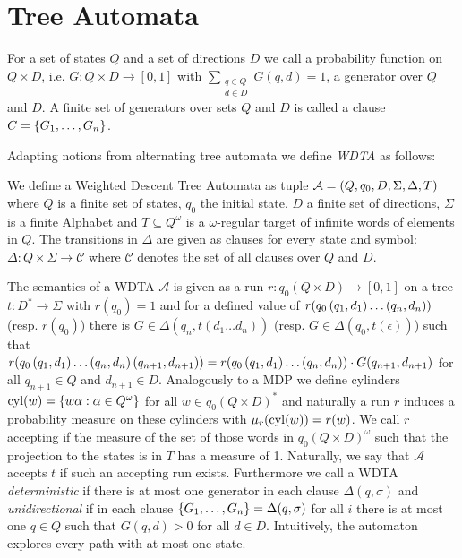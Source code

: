 \chapter{Tree Automata}
\begin{definition}[Generator]
  For a set of states $Q$ and a set of directions $D$ we call a probability
  function on $Q\times D$, i.e. $G: Q\times D\rightarrow [0,1]$ with
  $\sum\limits_{\substack{q\in Q\\ d\in D}}G(q,d) = 1$, a generator over $Q$
  and $D$. A finite set of generators over sets $Q$ and $D$ is called a clause
  $C = \left\{G_{1},\dots,G_{n}\right\}$.
\end{definition}
Adapting notions from alternating tree automata we define \emph{\ac{WDTA}} as
follows:
\begin{definition}
  We define a Weighted Descent Tree Automata as tuple
  $\mathcal{A} = \left(Q, q_{0}, D, \Sigma, \Delta, T\right)$ where $Q$ is a finite
  set of states, $q_{0}$ the initial state, $D$ a finite set of directions,
  $\Sigma$ is a finite Alphabet and $T\subseteq Q^{\omega}$ is a
  $\omega$-regular target of infinite words of elements in $Q$. The transitions
  in $\Delta$ are given as clauses for every state and symbol:
  $\Delta:Q\times\Sigma\rightarrow\mathcal{C}$
  where $\mathcal{C}$ denotes the set of all clauses over $Q$ and $D$.
\end{definition}
The semantics of a \ac{WDTA} $\mathcal{A}$ is given as a run
$r:q_{0}(Q\times D)\rightarrow [0,1]$ on a tree
$t:D^{*}\rightarrow\Sigma$ with $r(q_{0}) = 1$ and for a defined value
of $r(q_{0}\left(q_{1}, d_{1}\right)\dots\left(q_{n}, d_{n}\right))$ (resp. $r(q_{0})$)
there is $G\in\Delta(q_{n}, t(d_{1}\dots d_{n}))$ (resp. $G\in\Delta(q_{0},
t(\epsilon))$) such that
$r(q_{0}\left(q_{1}, d_{1}\right)\dots\left(q_{n}, d_{n}\right)\left(q_{n+1}, d_{n+1}\right))
= r(q_{0}\left(q_{1}, d_{1}\right)\dots\left(q_{n}, d_{n}\right))\cdot G(q_{n+1}, d_{n+1})$
for all $q_{n+1}\in Q$ and $d_{n+1}\in D$. Analogously to a \ac{MDP} we define
cylinders $\operatorname{cyl}(w) = \left\{w\alpha : \alpha\in Q^{\omega}\right\}$ for all
$w\in q_{0}(Q\times D)^{*}$ and naturally a run $r$ induces a
probability measure on these cylinders with $\mu_{r}(\operatorname{cyl}(w)) = r(w)$. We call
$r$ accepting if the measure of the set of those words in
$q_{0}(Q\times D)^{\omega}$ such that the projection to the states is in $T$
has a measure of 1. Naturally, we say that $\mathcal{A}$ accepts $t$ if such an
accepting run exists. Furthermore we call a \ac{WDTA} \emph{deterministic} if
there is at most one generator in each clause $\Delta(q, \sigma)$ and
\emph{unidirectional} if in each clause
$\left\{G_{1},\dots,G_{n}\right\} = \Delta(q, \sigma)$ for all $i$ there is at most one
$q\in Q$ such that $G(q, d) > 0$ for all $d\in D$. Intuitively, the automaton
explores every path with at most one state.

